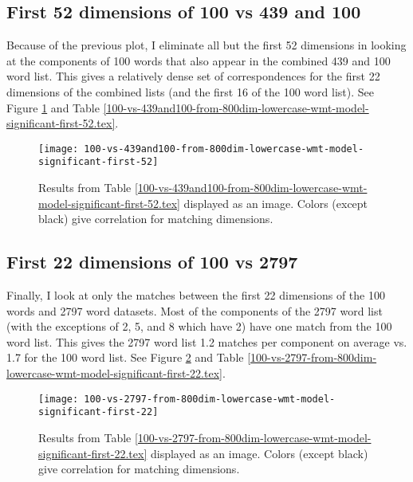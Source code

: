 \subsection{First 52 dimensions of 100 vs 439 and 100}

Because of the previous plot, I eliminate all but the first 52 dimensions in
looking at the components of 100 words that also appear in the combined 439
and 100 word list. This gives a relatively dense set of correspondences for the
first 22 dimensions of the combined lists (and the first 16 of the 100 word
list). See Figure \ref{fig:100vs439And100First52} and Table 
\ref{100-vs-439and100-from-800dim-lowercase-wmt-model-significant-first-52.tex}.



\begin{figure}[tbp]
    \texttt{[image: 100-vs-439and100-from-800dim-lowercase-wmt-model-significant-first-52]}
    \caption{Results from Table 
    \ref{100-vs-439and100-from-800dim-lowercase-wmt-model-significant-first-52.tex} 
    displayed as an image. Colors (except black) give correlation for matching 
    dimensions.}
    \label{fig:100vs439And100First52}
\end{figure}

\subsection{First 22 dimensions of 100 vs 2797}

Finally, I look at only the matches between the first 22 dimensions of the
100 words and 2797 word datasets. Most of the components of the 2797 word list 
(with the exceptions of 2, 5, and 8 which have 2) have one match from the 100 
word list. This gives the 2797 word list 1.2 matches per component on average
vs. 1.7 for the 100 word list.
See Figure \ref{fig:100vs2797First22} and
Table 
\ref{100-vs-2797-from-800dim-lowercase-wmt-model-significant-first-22.tex}.




\begin{figure}[tbp]
    \texttt{[image: 100-vs-2797-from-800dim-lowercase-wmt-model-significant-first-22]}
    \caption{Results from Table 
    \ref{100-vs-2797-from-800dim-lowercase-wmt-model-significant-first-22.tex} 
    displayed as an image. Colors (except black) give correlation for matching 
    dimensions.}
    \label{fig:100vs2797First22}
\end{figure}

